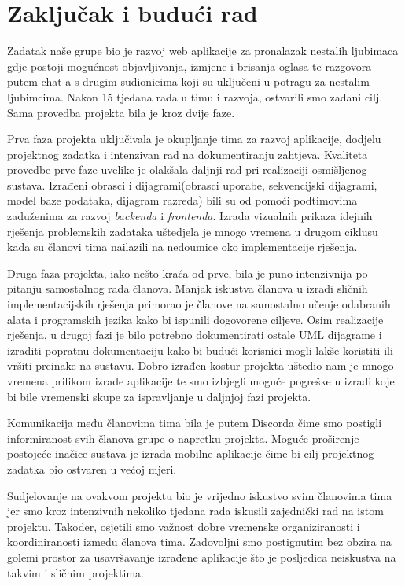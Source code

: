 \chapter{Zaključak i budući rad}
		 
		 Zadatak naše grupe bio je razvoj web aplikacije za pronalazak nestalih ljubimaca gdje postoji mogućnost objavljivanja, izmjene i brisanja oglasa te razgovora putem chat-a s drugim sudionicima koji su uključeni u potragu za nestalim ljubimcima. Nakon 15 tjedana rada u timu i razvoja, ostvarili smo zadani cilj. Sama provedba projekta bila je kroz dvije faze.
		 
		 Prva faza projekta uključivala je okupljanje tima za razvoj aplikacije, dodjelu projektnog zadatka i intenzivan rad na dokumentiranju zahtjeva. Kvaliteta provedbe prve faze uvelike je olakšala daljnji rad pri realizaciji osmišljenog sustava. Izrađeni obrasci i dijagrami(obrasci uporabe, sekvencijski dijagrami, model baze podataka, dijagram razreda) bili su od pomoći podtimovima zaduženima za razvoj \textit{backenda} i \textit{frontenda}. Izrada vizualnih prikaza idejnih rješenja problemskih zadataka uštedjela je mnogo vremena u drugom ciklusu kada su članovi tima nailazili na nedoumice oko implementacije rješenja.
		 
		 Druga faza projekta, iako nešto kraća od prve, bila je puno intenzivnija po pitanju samostalnog rada članova. Manjak iskustva članova u izradi sličnih implementacijskih rješenja primorao je članove na samostalno učenje odabranih alata i programskih jezika kako bi ispunili dogovorene ciljeve. Osim realizacije rješenja, u drugoj fazi je bilo potrebno dokumentirati ostale UML dijagrame i izraditi popratnu dokumentaciju kako bi budući korisnici mogli lakše koristiti ili vršiti preinake na sustavu. Dobro izrađen kostur projekta uštedio nam je mnogo vremena prilikom izrade aplikacije te smo izbjegli moguće pogreške u izradi koje bi bile vremenski skupe za ispravljanje u daljnjoj fazi projekta.
		 
		 Komunikacija među članovima tima bila je putem Discorda čime smo postigli informiranost svih članova grupe o napretku projekta. Moguće proširenje postojeće inačice sustava je izrada mobilne aplikacije čime bi cilj projektnog zadatka bio ostvaren u većoj mjeri.
		 
		 Sudjelovanje na ovakvom projektu bio je vrijedno iskustvo svim članovima tima jer smo kroz intenzivnih nekoliko tjedana rada iskusili zajednički rad na istom projektu. Također, osjetili smo važnost dobre vremenske organiziranosti i koordiniranosti između članova tima. Zadovoljni smo postignutim bez obzira na golemi prostor za usavršavanje izrađene aplikacije što je posljedica neiskustva na takvim i sličnim projektima.
		
		\eject 